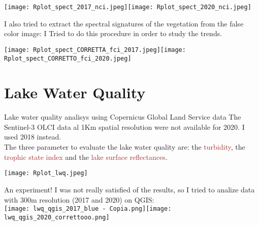 \documentclass{beamer}
\begin{document}
\begin{frame}
\texttt{\tiny{}}
    \texttt{[image: Rplot\_spect\_2017\_nci.jpeg]}\texttt{[image: Rplot\_spect\_2020\_nci.jpeg]}
\end{frame}

\begin{frame}
I also tried to extract the spectral signatures of the vegetation from the false color image:
\texttt{\tiny{}}
\normalsize{I Tried to do this procedure in order to study the trends.}
\end{frame}

\begin{frame}
\texttt{\tiny{}}
\end{frame}

\begin{frame}
\texttt{\tiny{}}
\centering
\texttt{[image: Rplot\_spect\_CORRETTA\_fci\_2017.jpeg]}\texttt{[image: Rplot\_spect\_CORRETTO\_fci\_2020.jpeg]}
\end{frame}


\section{Lake Water Quality}
\begin{frame}{\normalsize{Lake water quality analisys using Copernicus Global Land Service data}}
The Sentinel-3 OLCI data al 1Km spatial resolution were not available for 2020. I used 2018 instead.\\
\smallskip
The three parameter to evaluate the lake water quality are: the \textcolor{brown}{turbidity}, the \textcolor{brown}{trophic state index} and the \textcolor{brown}{lake surface reflectances}.
\texttt{\tiny{}}
\end{frame}

\begin{frame}
\texttt{\tiny{}}
\centering
\texttt{[image: Rplot\_lwq.jpeg]}
\end{frame}

\begin{frame}{An experiment!}
I was not really satisfied of the results, so I tried to analize data with 300m resolution (2017 and 2020) on QGIS:\\
\bigskip
\texttt{[image: lwq\_qgis\_2017\_blue - Copia.png]}\texttt{[image: lwq\_qgis\_2020\_correttooo.png]}
\end{frame}
\end{document}
